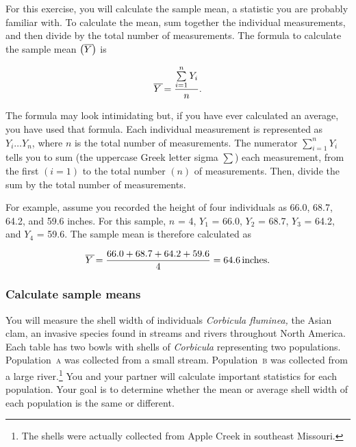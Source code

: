 \documentclass[12pt]{exam}
\newcommand*\meanY{\overline{Y\kern1.67pt}\kern-1.67pt}
\newcommand*\Popa{Population~\textsc{a}}
\newcommand*\Popb{Population~\textsc{b}}
\newcommand*\Corbicula{\textit{Corbicula}}
\begin{document}


For this exercise, you will calculate the sample mean, a statistic you are probably familiar with. 
To calculate the mean, sum together the individual measurements, and then divide by the total number
of measurements. The formula to calculate the sample mean $\left(\meanY \right)$ is

\[ \meanY = \frac{\sum\limits^n_{i=1} Y_i}{n}. \]

The formula may look intimidating but, if you have ever calculated an 
average, you have used that formula. Each individual measurement is represented as $Y_i \dots Y_n$, 
where $n$ is the total number of measurements. The numerator $\sum^n_{i=1} Y_i$ tells you to sum (the uppercase Greek letter sigma $\textstyle\sum$) each measurement, from the first 
$(i=1)$ to the total number $(n)$ of measurements. Then, divide the sum by the 
total number of measurements.

For example, assume you recorded the height of four individuals as 
66.0, 68.7, 64.2, and 59.6 inches. For this sample, $n$ = 4, $Y_1$ = 66.0, 
$Y_2$ = 68.7, $Y_3$ = 64.2, and $Y_4$ = 59.6. The sample mean is therefore calculated as

\[ \meanY = \frac{66.0 + 68.7 + 64.2 + 59.6}{4} = 64.6\,\mathrm{inches.} \]

\subsubsection*{Calculate sample means}

You will measure the shell width of individuals
\textit{Corbicula fluminea,} the Asian clam, an invasive species 
found in streams and rivers throughout North America. Each table has
two bowls with shells of \Corbicula{} representing two populations.
\Popa{} was collected from a small stream. \Popb{}
was collected from a large river.\footnote{The shells were actually collected from 
Apple Creek in southeast Missouri.} You
and your partner will calculate important statistics for each population.
Your goal is to determine whether the mean or average shell width
of each population is the same or different.
\end{document}
